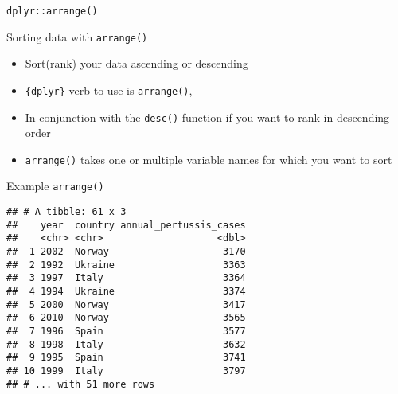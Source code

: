\documentclass[ignorenonframetext,]{beamer}
\newenvironment{Shaded}{\begin{snugshade}}{\end{snugshade}}
\newcommand{\KeywordTok}[1]{\textcolor[rgb]{0.13,0.29,0.53}{\textbf{#1}}}
\newcommand{\NormalTok}[1]{#1}
\newcommand{\OperatorTok}[1]{\textcolor[rgb]{0.81,0.36,0.00}{\textbf{#1}}}
\newcommand{\StringTok}[1]{\textcolor[rgb]{0.31,0.60,0.02}{#1}}
\providecommand{\tightlist}{%
  \setlength{\itemsep}{0pt}\setlength{\parskip}{0pt}}
\begin{document}
\begin{frame}[fragile]{\texttt{dplyr::arrange()}}
\protect\hypertarget{dplyrarrange}{}

\begin{block}{Sorting data with \texttt{arrange()}}

\begin{itemize}
\tightlist
\item
  Sort(rank) your data ascending or descending\\
\item
  \texttt{\{dplyr\}} verb to use is \texttt{arrange()},
\item
  In conjunction with the \texttt{desc()} function if you want to rank
  in descending order
\item
  \texttt{arrange()} takes one or multiple variable names for which you
  want to sort
\end{itemize}

\end{block}

\begin{block}{Example \texttt{arrange()}}

\begin{Shaded}
\end{Shaded}

\begin{verbatim}
## # A tibble: 61 x 3
##    year  country annual_pertussis_cases
##    <chr> <chr>                    <dbl>
##  1 2002  Norway                    3170
##  2 1992  Ukraine                   3363
##  3 1997  Italy                     3364
##  4 1994  Ukraine                   3374
##  5 2000  Norway                    3417
##  6 2010  Norway                    3565
##  7 1996  Spain                     3577
##  8 1998  Italy                     3632
##  9 1995  Spain                     3741
## 10 1999  Italy                     3797
## # ... with 51 more rows
\end{verbatim}

\begin{Shaded}
\end{Shaded}


\end{block}
\end{frame}
\end{document}
